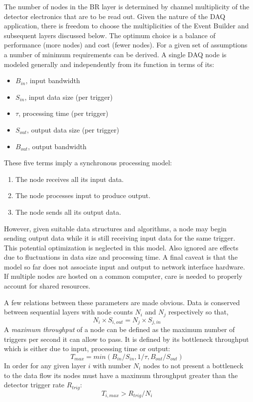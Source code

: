 \documentclass[pdftex,12pt,letter]{article}
\begin{document}
The number of nodes in the BR layer is determined by channel
multiplicity of the detector electronics that are to be read out.
Given the nature of the DAQ application, there is freedom to choose
the multiplicities of the Event Builder and subsequent layers
discussed below.  The optimum choice is a balance of performance (more
nodes) and cost (fewer nodes).  For a given set of assumptions a
number of minimum requirements can be derived.  A single DAQ node is
modeled generally and independently from its function in terms of its:
\begin{itemize}
\item $B_{in}$,  input bandwidth 
\item $S_{in}$, input data size (per trigger)
\item $\tau$, processing time (per trigger)
\item $S_{out}$, output data size (per trigger)
\item $B_{out}$,  output bandwidth
\end{itemize}
These five terms imply a synchronous
processing model:
\begin{enumerate}
\item The node receives all its input data.
\item The node processes input to produce output.
\item The node sends all its output data.
\end{enumerate}
However, given suitable data structures and algorithms, a node may
begin sending output data while it is still receiving input data for
the same trigger.  This potential optimization is neglected in this
model.  Also ignored are effects due to fluctuations in data size and
processing time.  A final caveat is that the model so far does not
associate input and output to network interface hardware.  If multiple
nodes are hosted on a common computer, care is needed to properly
account for shared resources.

A few relations between these parameters are made obvious.
Data is conserved between sequential layers with node counts $N_i$
and $N_j$ respectively so that,
\begin{equation}
  \label{eq:dataconservation}
  N_i \times S_{i,out} = N_j \times S_{j,in}
\end{equation}
A \textit{maximum throughput} of a node can be defined as the maximum
number of triggers per second it can allow to pass.  It is defined by
its bottleneck throughput which is either due to input, processing
time or output:
\begin{equation}
  \label{eq:throughput}
  T_{max} = min(B_{in}/S_{in}, 1/\tau, B_{out}/S_{out})
\end{equation}
In order for any given layer $i$ with number $N_i$ nodes to not present a
bottleneck to the data flow its nodes must have a maximum throughput greater
than the detector trigger rate $R_{trig}$:
\begin{equation}
  \label{eq:minthroughput}
   T_{i,max} > R_{trig} / N_i
\end{equation}
\end{document}
